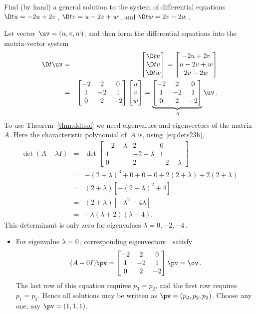 \begin{example} \label{eg:de3t} 
Find (by hand) a general solution to the system of differential equations \(\D tu=-2u+2v\)\,, \(\D tv=u-2v+w\)\,, and \(\D tw=2v-2w\)\,.

\begin{solution} 
Let vector~\(\uv=(u,v,w)\), and then form the differential equations into the matrix-vector system
\begin{eqnarray*}
\D t\uv&=&\begin{bmatrix} \D tu\\\D tv\\\D t w \end{bmatrix}
=\begin{bmatrix} -2u+2v\\u-2v+w\\2v-2w \end{bmatrix}
\\&=&\begin{bmatrix} -2&2&0\\1&-2&1\\0&2&-2 \end{bmatrix}
\begin{bmatrix} u\\v\\w \end{bmatrix}
=\underbrace{\begin{bmatrix} -2&2&0\\1&-2&1\\0&2&-2 \end{bmatrix}}_A\uv\,.
\end{eqnarray*}
To use Theorem~\ref{thm:ddtsol} we need eigenvalues and eigenvectors of the matrix~\(A\).
Here the characteristic polynomial of~\(A\) is, using~\eqref{eq:dets23b},
\begin{eqnarray*}
\det(A-\lambda I)&=&\det\begin{bmatrix} -2-\lambda&2&0\\1&-2-\lambda&1\\0&2&-2-\lambda \end{bmatrix}
\\&=&-(2+\lambda)^3+0+0-0+2(2+\lambda)+2(2+\lambda)
\\&=&(2+\lambda)\left[-(2+\lambda)^2+4\right]
\\&=&(2+\lambda)[-\lambda^2-4\lambda]
\\&=&-\lambda(\lambda+2)(\lambda+4).
\end{eqnarray*}
This determinant is only zero for eigenvalues \(\lambda=0,-2,-4\)\,.
\begin{itemize}
\item For eigenvalue \(\lambda=0\)\,, corresponding eigenvectors~\pv\ satisfy
\begin{equation*}
(A-0I)\pv=\begin{bmatrix} -2&2&0\\1&-2&1\\0&2&-2 \end{bmatrix}\pv=\ov\,.
\end{equation*}
The last row of this equation requires \(p_3=p_2\), and the first row requires \(p_1=p_2\).
Hence all solutions may be written as \(\pv=(p_2,p_2,p_2)\).
Choose any one, say \(\pv=(1,1,1)\).


\end{itemize}
\end{solution}
\end{example}
